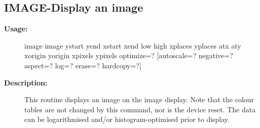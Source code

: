\subsection{IMAGE-\label{IMAGE}Display an image}
\begin{description}

\item [{\bf Usage:}]
 image image ystart yend xstart xend low high xplaces yplaces
       atx aty xorigin yorigin xpixels ypixels optimize=?
       [autoscale=? negative=? aspect=? log=? erase=? hardcopy=?]

\item [{\bf Description:}]
 This routine displays an image on the image display. Note that the
 colour tables are not changed by this command, nor is the device
 reset. The data can be logarithmised and/or histogram-optimised
 prior to display.


\end{description}
